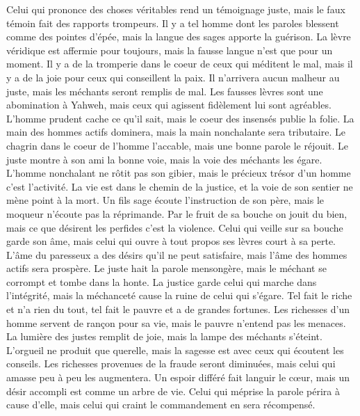 \begin{multicols}{2}
Celui qui prononce des choses véritables rend un témoignage juste, mais le faux témoin fait des rapports trompeurs.
Il y a tel homme dont les paroles blessent comme des pointes d'épée, mais la langue des sages apporte la guérison.
La lèvre véridique est affermie pour toujours, mais la fausse langue n'est que pour un moment.
Il y a de la tromperie dans le coeur de ceux qui méditent le mal, mais il y a de la joie pour ceux qui conseillent la paix.
Il n’arrivera aucun malheur au juste, mais les méchants seront remplis de mal.
Les fausses lèvres sont une abomination à Yahweh, mais ceux qui agissent fidèlement lui sont agréables.
L'homme prudent cache ce qu’il sait, mais le coeur des insensés publie la folie.
La main des hommes actifs dominera, mais la main nonchalante sera tributaire.
Le chagrin dans le coeur de l'homme l'accable, mais une bonne parole le réjouit.
Le juste montre à son ami la bonne voie, mais la voie des méchants les égare.
L’homme nonchalant ne rôtit pas son gibier, mais le précieux trésor d'un homme c’est l’activité.
La vie est dans le chemin de la justice, et la voie de son sentier ne mène point à la mort.
\VerseOne{}Un fils sage écoute l'instruction de son père, mais le moqueur n'écoute pas la réprimande.
Par le fruit de sa bouche on jouit du bien, mais ce que désirent les perfides c’est la violence.
Celui qui veille sur sa bouche garde son âme, mais celui qui ouvre à tout propos ses lèvres court à sa perte.
L'âme du paresseux a des désirs qu’il ne peut satisfaire, mais l'âme des hommes actifs sera prospère.
Le juste hait la parole mensongère, mais le méchant se corrompt et tombe dans la honte.
La justice garde celui qui marche dans l’intégrité, mais la méchanceté cause la ruine de celui qui s'égare.
Tel fait le riche et n'a rien du tout, tel fait le pauvre et a de grandes fortunes.
Les richesses d'un homme servent de rançon pour sa vie, mais le pauvre n’entend pas les menaces.
La lumière des justes remplit de joie, mais la lampe des méchants s’éteint.
L'orgueil ne produit que querelle, mais la sagesse est avec ceux qui écoutent les conseils.
Les richesses provenues de la fraude seront diminuées, mais celui qui amasse peu à peu les augmentera.
Un espoir différé fait languir le cœur, mais un désir accompli est comme un arbre de vie.
Celui qui méprise la parole périra à cause d'elle, mais celui qui craint le commandement en sera récompensé.

\end{multicols}
